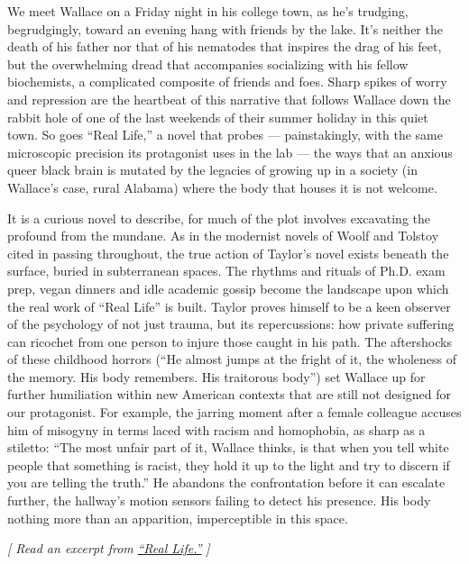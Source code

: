 We meet Wallace on a Friday night in his college town, as he's trudging,
begrudgingly, toward an evening hang with friends by the lake. It's
neither the death of his father nor that of his nematodes that inspires
the drag of his feet, but the overwhelming dread that accompanies
socializing with his fellow biochemists, a complicated composite of
friends and foes. Sharp spikes of worry and repression are the heartbeat
of this narrative that follows Wallace down the rabbit hole of one of
the last weekends of their summer holiday in this quiet town. So goes
``Real Life,'' a novel that probes --- painstakingly, with the same
microscopic precision its protagonist uses in the lab --- the ways that
an anxious queer black brain is mutated by the legacies of growing up in
a society (in Wallace's case, rural Alabama) where the body that houses
it is not welcome.

It is a curious novel to describe, for much of the plot involves
excavating the profound from the mundane. As in the modernist novels of
Woolf and Tolstoy cited in passing throughout, the true action of
Taylor's novel exists beneath the surface, buried in subterranean
spaces. The rhythms and rituals of Ph.D. exam prep, vegan dinners and
idle academic gossip become the landscape upon which the real work of
``Real Life'' is built. Taylor proves himself to be a keen observer of
the psychology of not just trauma, but its repercussions: how private
suffering can ricochet from one person to injure those caught in his
path. The aftershocks of these childhood horrors (``He almost jumps at
the fright of it, the wholeness of the memory. His body remembers. His
traitorous body'') set Wallace up for further humiliation within new
American contexts that are still not designed for our protagonist. For
example, the jarring moment after a female colleague accuses him of
misogyny in terms laced with racism and homophobia, as sharp as a
stiletto: ``The most unfair part of it, Wallace thinks, is that when you
tell white people that something is racist, they hold it up to the light
and try to discern if you are telling the truth.'' He abandons the
confrontation before it can escalate further, the hallway's motion
sensors failing to detect his presence. His body nothing more than an
apparition, imperceptible in this space.

\emph{{[} Read an excerpt from}
\href{https://www.nytimes3xbfgragh.onion/2020/02/18/books/review/real-life-by-brandon-taylor-an-excerpt.html}{\emph{``Real
Life.''}} \emph{{]}}

